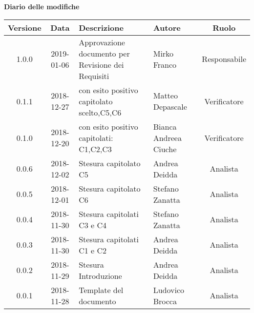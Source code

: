 \begin{center}
		\textbf{Diario delle modifiche}
	\end{center}
	\begin{center}
		\begin{tabularx}{\textwidth}{|c|c|X|X|c|}
			\hline
			\textbf{Versione} & \textbf{Data} & \textbf{Descrizione} & \textbf{Autore} & \textbf{Ruolo} \\
			\hline
			1.0.0 & 2019-01-06 & Approvazione documento per Revisione dei Requisiti & Mirko Franco & Responsabile \\
			\hline
			0.1.1 & 2018-12-27 & \glossario{Verifica} con esito positivo capitolato scelto,C5,C6  & Matteo Depascale & Verificatore \\
			\hline 
			0.1.0 & 2018-12-20 & \glossario{Verifica} con esito positivo  capitolati: C1,C2,C3 & Bianca Andreea Ciuche & Verificatore \\
			\hline
			0.0.6 & 2018-12-02 & Stesura capitolato C5& Andrea Deidda & Analista \\
			\hline
			0.0.5 & 2018-12-01 & Stesura capitolato C6 & Stefano Zanatta & Analista \\
			\hline
			0.0.4 & 2018-11-30 & Stesura capitolati C3 e C4 & Stefano Zanatta & Analista \\
			\hline
			0.0.3 & 2018-11-30 & Stesura capitolati C1 e C2 & Andrea Deidda & Analista \\
			\hline
			0.0.2 & 2018-11-29 & Stesura Introduzione & Andrea Deidda & Analista \\
			\hline
			0.0.1 &  2018-11-28& Template  del documento & Ludovico Brocca & Analista\\
			\hline
		\end{tabularx}
	\end{center}
\newpage
